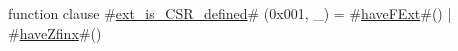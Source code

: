 function clause #\hyperref[sailRISCVzextzyiszyCSRzydefined]{ext\_is\_CSR\_defined}# (0x001, _) = #\hyperref[sailRISCVzhaveFExt]{haveFExt}#() | #\hyperref[sailRISCVzhaveZfinx]{haveZfinx}#()
